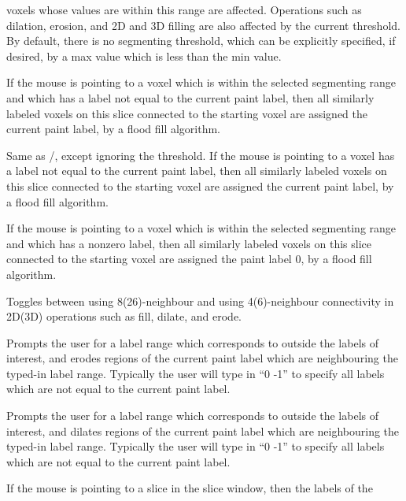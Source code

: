 \documentclass[11pt,letterpaper]{article}
\newcommand{\menutwo}[2]{{\scriptsize \fbox{\bf #1}/\fbox{\bf #2}}}
\begin{document}
\begin{description}
    voxels whose values are within this range are affected.  Operations
    such as dilation, erosion, and 2D and 3D filling are also affected by
    the current threshold.  By
    default, there is no segmenting threshold, which can be explicitly
    specified, if desired, by a max value which is less than the min value.
\item[\menutwo{Segmenting}{Label Fill}]  If the mouse is pointing
    to a voxel which is within the selected segmenting range and which
    has a label not equal to the current paint label, then all similarly
    labeled voxels on this slice connected
    to the starting voxel are assigned the current paint label, by a
    flood fill algorithm.
\item[\menutwo{Segmenting}{Label Fill No Thrs}]  Same as
    \menutwo{Segmenting}{Label Fill}, except ignoring the threshold.
    If the mouse is pointing to a voxel has a label not equal to the
    current paint label, then all
    similarly labeled voxels on this slice connected
    to the starting voxel are assigned the current paint label, by a
    flood fill algorithm.
\item[\menutwo{Segmenting}{Clear Fill}]  If the mouse is pointing
    to a voxel which is within the selected segmenting range and which
    has a nonzero label, then all similarly labeled voxels on this slice
    connected to the starting voxel are assigned the paint label 0, by a
    flood fill algorithm.
\item[\menutwo{Segmenting}{Connectivity}]  Toggles between using
    8(26)-neighbour
    and using 4(6)-neighbour connectivity in 2D(3D) operations such as fill,
    dilate, and erode.
\item[\menutwo{Segmenting}{Erode 3D}]  Prompts the user for a label range
    which corresponds to outside the labels of interest, and erodes regions
    of the current paint label which are neighbouring the typed-in label
    range.  Typically the user will type in ``0 -1'' to specify all labels
    which are not equal to the current paint label.
\item[\menutwo{Segmenting}{Dilate 3D}]  Prompts the user for a label range
    which corresponds to outside the labels of interest, and dilates regions
    of the current paint label which are neighbouring the typed-in label
    range.  Typically the user will type in ``0 -1'' to specify all labels
    which are not equal to the current paint label.
\item[\menutwo{Segmenting}{Copy from Rt/Sup/Ant}]  If the mouse is
    pointing to a slice in the slice window, then the labels of the

\end{description}
\end{document}
